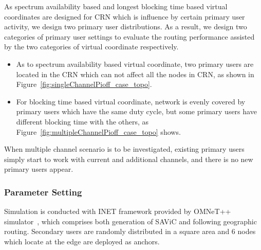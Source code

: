 As spectrum availability based and longest blocking time based virtual coordinates are designed for CRN which is influence by certain primary user activity, we design two primary user distributions.
As a result, we design two categories of primary user settings to evaluate the routing performance assisted by the two categories of virtual coordinate respectively.
\begin{itemize}
\item As to spectrum availability based virtual coordinate, two primary users are located in the CRN which can not affect all the nodes in CRN, as shown in Figure~\ref{fig:singleChannelPioff_case_topo}.
\item For blocking time based virtual coordinate, network is evenly covered by primary users which have the same duty cycle, but some primary users have different blocking time with the others, as Figure~\ref{fig:multipleChannelPioff_case_topo} shows.
\end{itemize}
When multiple channel scenario is to be investigated, existing primary users simply start to work with current and additional channels, and there is no new primary users appear.



\subsubsection{Parameter Setting}
Simulation is conducted with INET framework provided by OMNeT++ simulator~\cite{omnetpp_paper08}, which comprises both generation of SAViC and following geographic routing. 
Secondary users are randomly distributed in a square area and 6 nodes which locate at the edge are deployed as anchors.

